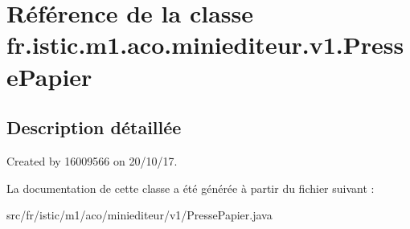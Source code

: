 \hypertarget{classfr_1_1istic_1_1m1_1_1aco_1_1miniediteur_1_1v1_1_1PressePapier}{}\section{Référence de la classe fr.\+istic.\+m1.\+aco.\+miniediteur.\+v1.\+Presse\+Papier}
\label{classfr_1_1istic_1_1m1_1_1aco_1_1miniediteur_1_1v1_1_1PressePapier}


\subsection{Description détaillée}
Created by 16009566 on 20/10/17. 

La documentation de cette classe a été générée à partir du fichier suivant \+:\begin{DoxyCompactItemize}
\item 
src/fr/istic/m1/aco/miniediteur/v1/Presse\+Papier.\+java\end{DoxyCompactItemize}
